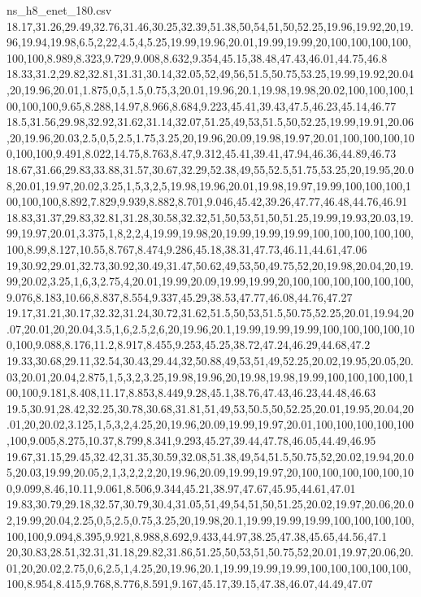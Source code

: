 \begin{filecontents*}[overwrite]{ns_h8_enet_180.csv}
18.17,31.26,29.49,32.76,31.46,30.25,32.39,51.38,50,54,51,50,52.25,19.96,19.92,20,19.96,19.94,19.98,6.5,2,22,4.5,4,5.25,19.99,19.96,20.01,19.99,19.99,20,100,100,100,100,100,100,8.989,8.323,9.729,9.008,8.632,9.354,45.15,38.48,47.43,46.01,44.75,46.8
18.33,31.2,29.82,32.81,31.31,30.14,32.05,52,49,56,51.5,50.75,53.25,19.99,19.92,20.04,20,19.96,20.01,1.875,0,5,1.5,0.75,3,20.01,19.96,20.1,19.98,19.98,20.02,100,100,100,100,100,100,9.65,8.288,14.97,8.966,8.684,9.223,45.41,39.43,47.5,46.23,45.14,46.77
18.5,31.56,29.98,32.92,31.62,31.14,32.07,51.25,49,53,51.5,50,52.25,19.99,19.91,20.06,20,19.96,20.03,2.5,0,5,2.5,1.75,3.25,20,19.96,20.09,19.98,19.97,20.01,100,100,100,100,100,100,9.491,8.022,14.75,8.763,8.47,9.312,45.41,39.41,47.94,46.36,44.89,46.73
18.67,31.66,29.83,33.88,31.57,30.67,32.29,52.38,49,55,52.5,51.75,53.25,20,19.95,20.08,20.01,19.97,20.02,3.25,1,5,3,2,5,19.98,19.96,20.01,19.98,19.97,19.99,100,100,100,100,100,100,8.892,7.829,9.939,8.882,8.701,9.046,45.42,39.26,47.77,46.48,44.76,46.91
18.83,31.37,29.83,32.81,31.28,30.58,32.32,51,50,53,51,50,51.25,19.99,19.93,20.03,19.99,19.97,20.01,3.375,1,8,2,2,4,19.99,19.98,20,19.99,19.99,19.99,100,100,100,100,100,100,8.99,8.127,10.55,8.767,8.474,9.286,45.18,38.31,47.73,46.11,44.61,47.06
19,30.92,29.01,32.73,30.92,30.49,31.47,50.62,49,53,50,49.75,52,20,19.98,20.04,20,19.99,20.02,3.25,1,6,3,2.75,4,20.01,19.99,20.09,19.99,19.99,20,100,100,100,100,100,100,9.076,8.183,10.66,8.837,8.554,9.337,45.29,38.53,47.77,46.08,44.76,47.27
19.17,31.21,30.17,32.32,31.24,30.72,31.62,51.5,50,53,51.5,50.75,52.25,20.01,19.94,20.07,20.01,20,20.04,3.5,1,6,2.5,2,6,20,19.96,20.1,19.99,19.99,19.99,100,100,100,100,100,100,9.088,8.176,11.2,8.917,8.455,9.253,45.25,38.72,47.24,46.29,44.68,47.2
19.33,30.68,29.11,32.54,30.43,29.44,32,50.88,49,53,51,49,52.25,20.02,19.95,20.05,20.03,20.01,20.04,2.875,1,5,3,2,3.25,19.98,19.96,20,19.98,19.98,19.99,100,100,100,100,100,100,9.181,8.408,11.17,8.853,8.449,9.28,45.1,38.76,47.43,46.23,44.48,46.63
19.5,30.91,28.42,32.25,30.78,30.68,31.81,51,49,53,50.5,50,52.25,20.01,19.95,20.04,20.01,20,20.02,3.125,1,5,3,2,4.25,20,19.96,20.09,19.99,19.97,20.01,100,100,100,100,100,100,9.005,8.275,10.37,8.799,8.341,9.293,45.27,39.44,47.78,46.05,44.49,46.95
19.67,31.15,29.45,32.42,31.35,30.59,32.08,51.38,49,54,51.5,50.75,52,20.02,19.94,20.05,20.03,19.99,20.05,2,1,3,2,2,2,20,19.96,20.09,19.99,19.97,20,100,100,100,100,100,100,9.099,8.46,10.11,9.061,8.506,9.344,45.21,38.97,47.67,45.95,44.61,47.01
19.83,30.79,29.18,32.57,30.79,30.4,31.05,51,49,54,51,50,51.25,20.02,19.97,20.06,20.02,19.99,20.04,2.25,0,5,2.5,0.75,3.25,20,19.98,20.1,19.99,19.99,19.99,100,100,100,100,100,100,9.094,8.395,9.921,8.988,8.692,9.433,44.97,38.25,47.38,45.65,44.56,47.1
20,30.83,28.51,32.31,31.18,29.82,31.86,51.25,50,53,51,50.75,52,20.01,19.97,20.06,20.01,20,20.02,2.75,0,6,2.5,1,4.25,20,19.96,20.1,19.99,19.99,19.99,100,100,100,100,100,100,8.954,8.415,9.768,8.776,8.591,9.167,45.17,39.15,47.38,46.07,44.49,47.07
\end{filecontents*}

